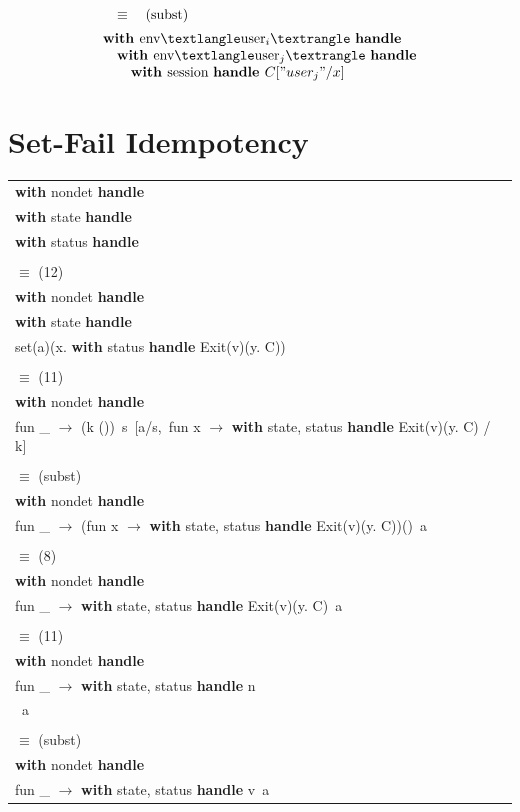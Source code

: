 \documentclass[logo,bsc,singlespacing,parskip]{infthesis}
\begin{document}
\[\begin{array}{l}
\quad\equiv\quad (\text{subst}) \\[5pt]
\textbf{with } \text{env}⟨\text{user}_i⟩\ \textbf{handle} \\
\quad \textbf{with } \text{env}⟨\text{user}_j⟩\ \textbf{handle} \\
\quad\quad \textbf{with } \text{session}\ \textbf{handle } C["user_j"/x] \\
\end{array}
\]


\section{Set-Fail Idempotency} \label{set-fail-idempotency}
\begin{longtable}{@{}l@{}}
\textbf{with } nondet \textbf{ handle} \\
\quad \textbf{with } state \textbf{ handle} \\
\quad\quad \textbf{with } status \textbf{ handle} \\
\\
\quad$\equiv$ (12) \\
\textbf{with } nondet \textbf{ handle} \\
\quad \textbf{with } state \textbf{ handle} \\
\quad\quad set(a)(x. \textbf{with } status \textbf{ handle } Exit(v)(y. C)) \\
\\
\quad$\equiv$ (11) \\
\textbf{with } nondet \textbf{ handle} \\
\quad fun \_ $\rightarrow$ (k ())\ s\ [a/s,\ fun x $\rightarrow$ \textbf{with } state, status \textbf{ handle } Exit(v)(y. C) / k] \\
\\
\quad$\equiv$ (subst) \\
\textbf{with } nondet \textbf{ handle} \\
\quad fun \_ $\rightarrow$ (fun x $\rightarrow$ \textbf{with } state, status \textbf{ handle } Exit(v)(y. C))()\ a \\
\\
\quad$\equiv$ (8) \\
\textbf{with } nondet \textbf{ handle} \\
\quad fun \_ $\rightarrow$ \textbf{with } state, status \textbf{ handle } Exit(v)(y. C)\ a \\
\\
\quad$\equiv$ (11) \\
\textbf{with } nondet \textbf{ handle} \\
\quad fun \_ $\rightarrow$ \textbf{with } state, status \textbf{ handle } n \\
\quad{}\ a \\
\\
\quad$\equiv$ (subst) \\
\textbf{with } nondet \textbf{ handle} \\
\quad fun \_ $\rightarrow$ \textbf{with } state, status \textbf{ handle } v\ a \\
\end{longtable}
\end{document}

